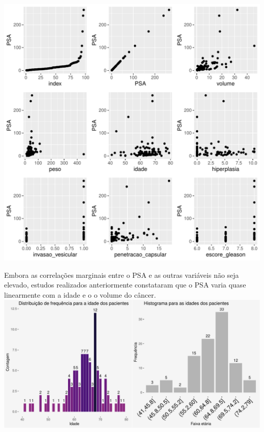 \documentclass[runningheads]{llncs}\usepackage[]{graphicx}\usepackage[]{color}
\makeatletter
\def\maxwidth{ %
  \ifdim\Gin@nat@width>\linewidth
    \linewidth
  \else
    \Gin@nat@width
  \fi
}
\newenvironment{knitrout}{}{} %
\makeatother
\begin{document}
\begin{knitrout}
\color{fgcolor}
\includegraphics[width=\maxwidth]{figure/unnamed-chunk-6-1} 

\end{knitrout}
\vspace{-0.05cm}
Embora as correlações marginais entre o PSA  e as outras variáveis não seja elevado, estudos realizados anteriormente
constataram que o PSA varia quase linearmente com a idade e o o volume do câncer. \newpage
\begin{knitrout}
\color{fgcolor}
\includegraphics[width=\maxwidth]{figure/unnamed-chunk-7-1} 

\end{knitrout}
\end{document}
